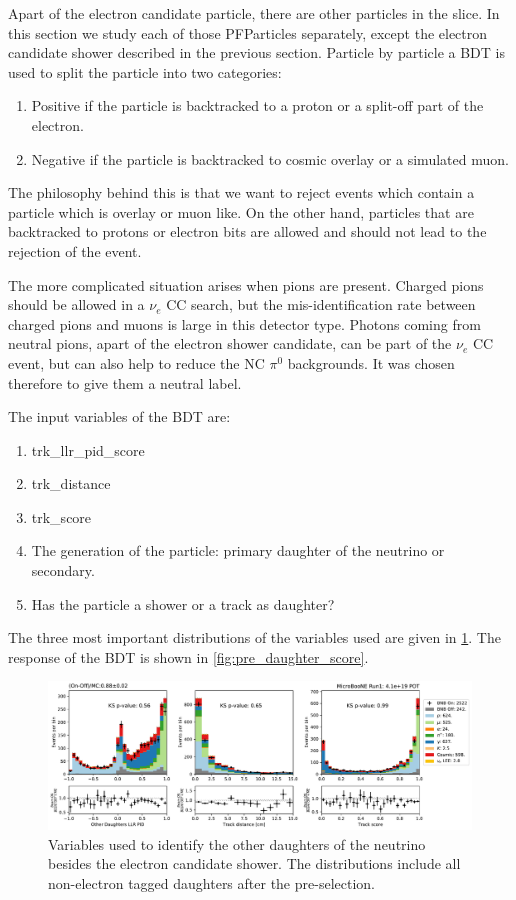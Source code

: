Apart of the electron candidate particle, there are other particles in the slice. In this section we study each of those PFParticles separately, except the electron candidate shower described in the previous section. Particle by particle a BDT is used to split the particle into two categories:
\begin{enumerate}
    \item Positive if the particle is backtracked to a proton or a split-off part of the electron.
    \item Negative if the particle is backtracked to cosmic overlay or a simulated muon. 
\end{enumerate}
The philosophy behind this is that we want to reject events which contain a particle which is overlay or muon like. On the other hand, particles that are backtracked to protons or electron bits are allowed and should not lead to the rejection of the event.
\par The more complicated situation arises when pions are present. Charged pions should be allowed in a $\nu_e$ CC search, but the mis-identification rate between charged pions and muons is large in this detector type. Photons coming from neutral pions, apart of the electron shower candidate, can be part of the $\nu_e$ CC event, but can also help to reduce the NC $\pi^0$ backgrounds. It was chosen therefore to give them a neutral label. 

The input variables of the BDT are:
\begin{enumerate}
    \item trk\_llr\_pid\_score
    \item trk\_distance
    \item trk\_score
    \item The generation of the particle: primary daughter of the neutrino or secondary.
    \item Has the particle a shower or a track as daughter?
\end{enumerate}
The three most important distributions of the variables used are given in \cref{fig:pre_daughter_1}. The response of the BDT is shown in \cref{fig:pre_daughter_score}.


\begin{figure}
    \centering
    \includegraphics[width=\textwidth]{NueCCsel/Images/run1/pre_daughter_1.pdf}
    \caption{Variables used to identify the other daughters of the neutrino besides the electron candidate shower. The distributions include all non-electron tagged daughters after the pre-selection.}
    \label{fig:pre_daughter_1}
\end{figure}

